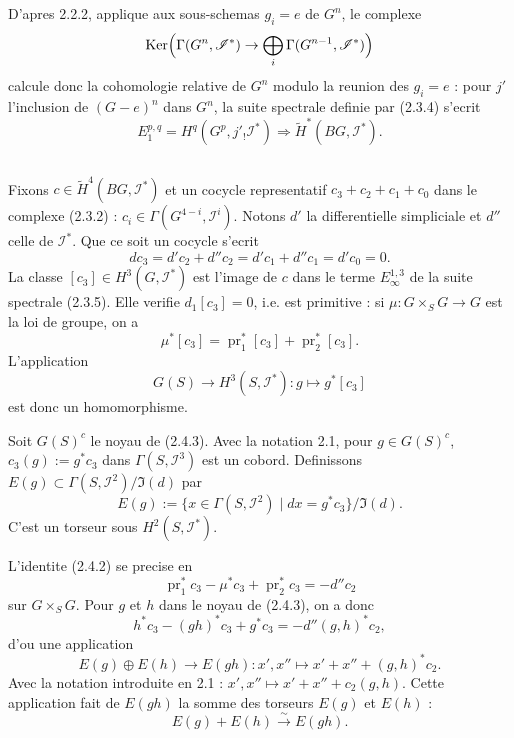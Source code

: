 \documentclass[11pt,a4paper]{article}
\theoremstyle{plain}
\theoremstyle{definition}
\DeclareMathOperator{\Ker}{Ker}
\DeclareMathOperator{\pr}{pr}
\begin{document}
D'apres 2.2.2, applique aux sous-schemas $g_i = e$ de $G^n$, le complexe
\[
\Ker\Bigl(\Gamma(G^n, \mathscr{I}^*) \to \bigoplus_i \Gamma(G^{n-1}, \mathscr{I}^*)\Bigr)
\]
calcule donc la cohomologie relative de $G^n$ modulo la reunion des $g_i = e$ : pour $j'$ l'inclusion de $(G - e)^n$ dans $G^n$, la suite spectrale definie par (2.3.4) s'ecrit
\begin{equation}\label{2.3.7}
E_1^{p,q} = H^q(G^p, j'_! \mathscr{I}^*) \Rightarrow \widetilde{H}^*(BG, \mathscr{I}^*).
\end{equation}

\subsection{}\label{2.4}

Fixons $c \in \widetilde{H}^4(BG, \mathscr{I}^*)$ et un cocycle representatif $c_3 + c_2 + c_1 + c_0$ dans le complexe (2.3.2) : $c_i \in \Gamma(G^{4-i}, \mathscr{I}^i)$. Notons $d'$ la differentielle simpliciale et $d''$ celle de $\mathscr{I}^*$. Que ce soit un cocycle s'ecrit
\begin{equation}\label{2.4.1}
d c_3 = d'c_2 + d''c_2 = d'c_1 + d''c_1 = d'c_0 = 0.
\end{equation}
La classe $[c_3] \in H^3(G, \mathscr{I}^*)$ est l'image de $c$ dans le terme $E_\infty^{1,3}$ de la suite spectrale (2.3.5). Elle verifie $d_1[c_3] = 0$, i.e. est primitive : si $\mu : G \times_S G \to G$ est la loi de groupe, on a
\begin{equation}\label{2.4.2}
\mu^*[c_3] = \pr_1^*[c_3] + \pr_2^*[c_3].
\end{equation}
L'application
\begin{equation}\label{2.4.3}
G(S) \to H^3(S, \mathscr{I}^*) : g \mapsto g^*[c_3]
\end{equation}
est donc un homomorphisme.

Soit $G(S)^c$ le noyau de (2.4.3). Avec la notation 2.1, pour $g \in G(S)^c$, $c_3(g) := g^* c_3$ dans $\Gamma(S, \mathscr{I}^3)$ est un cobord. Definissons $E(g) \subset \Gamma(S, \mathscr{I}^2)/\Im(d)$ par
\begin{equation}\label{2.4.4}
E(g) := \{x \in \Gamma(S, \mathscr{I}^2) \mid dx = g^* c_3\}/\Im(d).
\end{equation}
C'est un torseur sous $H^2(S, \mathscr{I}^*)$.

L'identite (2.4.2) se precise en
\[
\pr_1^* c_3 - \mu^* c_3 + \pr_2^* c_3 = -d'' c_2
\]
sur $G \times_S G$. Pour $g$ et $h$ dans le noyau de (2.4.3), on a donc
\[
h^* c_3 - (gh)^* c_3 + g^* c_3 = -d'' (g, h)^* c_2,
\]
d'ou une application
\begin{equation}\label{2.4.5}
E(g) \oplus E(h) \to E(gh) : x', x'' \mapsto x' + x'' + (g, h)^* c_2.
\end{equation}
Avec la notation introduite en 2.1 : $x', x'' \mapsto x' + x'' + c_2(g, h)$. Cette application fait de $E(gh)$ la somme des torseurs $E(g)$ et $E(h)$ :
\begin{equation}\label{2.4.6}
E(g) + E(h) \xrightarrow{\sim} E(gh).
\end{equation}
\end{document}
